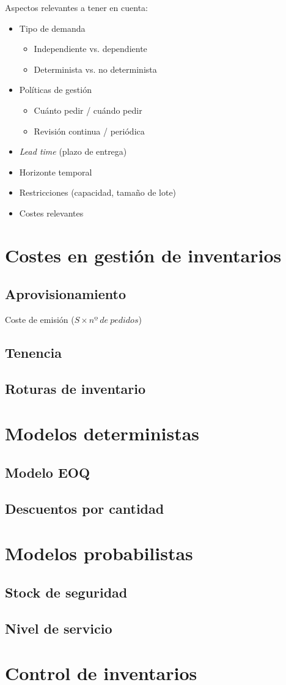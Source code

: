 Aspectos relevantes a tener en cuenta:
\begin{itemize}
    \item Tipo de demanda
    \begin{itemize}
        \item Independiente vs. dependiente
        \item Determinista vs. no determinista
    \end{itemize}
    \item Políticas de gestión
    \begin{itemize}
        \item Cuánto pedir / cuándo pedir
        \item Revisión continua / periódica
    \end{itemize}
    \item \textit{Lead time} (plazo de entrega)
    \item Horizonte temporal
    \item Restricciones (capacidad, tamaño de lote)
    \item Costes relevantes
\end{itemize}

\section{Costes en gestión de inventarios}
\subsection{Aprovisionamiento}
Coste de emisión ($S \times nº\ de\ pedidos$)


\subsection{Tenencia}

\subsection{Roturas de inventario}

\section{Modelos deterministas}
\subsection{Modelo EOQ}

\subsection{Descuentos por cantidad}

\section{Modelos probabilistas}
\subsection{Stock de seguridad}

\subsection{Nivel de servicio}

\section{Control de inventarios}